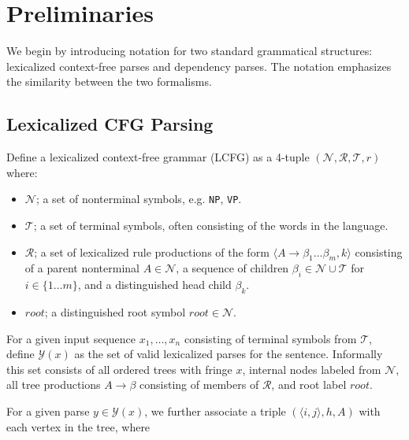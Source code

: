\documentclass[11pt,letterpaper]{article}
\newcommand{\nonterms}{\mathcal{N}}
\newcommand{\rules}{\mathcal{R}}
\newcommand{\terms}{\mathcal{T}}
\newcommand{\Span}[1]{\langle #1 \rangle}
\newcommand{\Tag}[1]{\texttt{#1}}
\newcommand{\Root}{root}
\begin{document}
\section{Preliminaries}

We begin by introducing notation for two standard grammatical structures: lexicalized context-free parses and dependency parses. The notation emphasizes the similarity between the two formalisms.

\subsection{Lexicalized CFG Parsing}

Define a lexicalized context-free grammar (LCFG) as a 4-tuple $(\nonterms, \rules, \terms, r)$ where:
\begin{itemize}
\item $\nonterms$; a set of nonterminal symbols, e.g. \Tag{NP}, \Tag{VP}.
\item $\terms$; a set of terminal symbols, often consisting of the words in the language.
\item $\rules$; a set of lexicalized rule productions of the form $\langle A \rightarrow \beta_1 \ldots \beta_m, k\rangle$ consisting of a parent nonterminal $A \in \nonterms$, a sequence of children $\beta_i \in \nonterms \cup \terms$ for $i \in \{1\ldots m\}$, and a distinguished head child $\beta_k$.
\item $\Root$; a distinguished root symbol $\Root \in \nonterms$.
\end{itemize}

For a given input sequence $x_1, \ldots, x_n$ consisting of terminal symbols from $\terms$, define $\mathcal{Y}(x)$ as the set of valid lexicalized parses for the sentence. Informally this set consists of all ordered trees with fringe $x$, internal nodes labeled from $\nonterms$, all tree productions  $A \rightarrow \beta$ consisting of members of $\rules$, and root label $\Root$.



For a given parse $y \in \mathcal{Y}(x)$,
we further associate a triple $(\Span{i, j}, h, A)$ with each vertex in the tree, where
\end{document}
